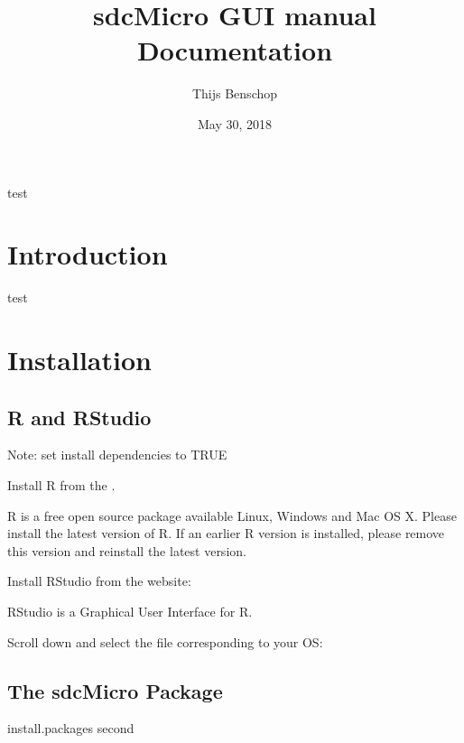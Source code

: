 \documentclass[letterpaper,10pt,english]{sphinxmanual}
\title{sdcMicro GUI manual Documentation}
\date{May 30, 2018}
\author{Thijs Benschop}
\begin{document}
\maketitle
\sphinxtableofcontents
{}\label{\detokenize{index::doc}}


test


\chapter{Introduction}
\label{\detokenize{introduction:introduction}}\label{\detokenize{introduction::doc}}\label{\detokenize{introduction:welcome-to-sdcmicro-gui-manual-s-documentation}}
test


\chapter{Installation}
\label{\detokenize{installation::doc}}\label{\detokenize{installation:installation}}

\section{R and RStudio}
\label{\detokenize{installation:r-and-rstudio}}
Note: set install dependencies to TRUE

Install R from the  .

\noindent{}

R is a free open source package available Linux, Windows and Mac OS X.
Please install the latest version of R. If an earlier R version is installed,
please remove this version and reinstall the latest version.

Install RStudio from the website: 

RStudio is a Graphical User Interface for R.

Scroll down and select the file corresponding to your OS:


\section{The sdcMicro Package}
\label{\detokenize{installation:the-sdcmicro-package}}
%
\begin{sphinxVerbatim}[commandchars=\\\{\}]
install.packages
second
\end{sphinxVerbatim}
\end{document}
